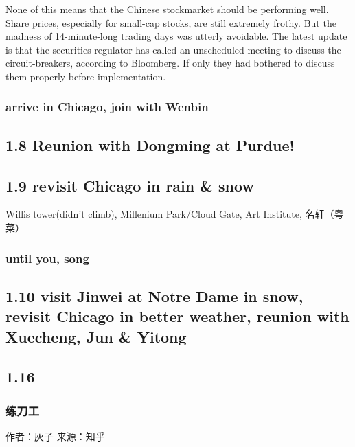 \documentclass[11pt]{article}
\begin{document}
None of this means that the Chinese stockmarket should be performing well. Share
prices, especially for small-cap stocks, are still extremely frothy. But the
madness of 14-minute-long trading days was utterly avoidable. The latest update
is that the securities regulator has called an unscheduled meeting to discuss
the circuit-breakers, according to Bloomberg. If only they had bothered to
discuss them properly before implementation.
\subsubsection*{arrive in Chicago, join with Wenbin}
\label{sec:orgheadline22}
\subsection*{1.8 Reunion with Dongming at Purdue!}
\label{sec:orgheadline24}
\subsection*{1.9 revisit Chicago in rain \& snow}
\label{sec:orgheadline26}
Willis tower(didn't climb), Millenium Park/Cloud Gate, Art Institute, 名轩（粤菜）
\subsubsection*{\textbf{until you}, song}
\label{sec:orgheadline25}
\subsection*{1.10 visit Jinwei at Notre Dame in snow, revisit Chicago in better weather, reunion with Xuecheng, Jun \& Yitong}
\label{sec:orgheadline27}
\subsection*{1.16}
\label{sec:orgheadline30}
\subsubsection*{练刀工}
\label{sec:orgheadline28}
作者：灰子
来源：知乎
\end{document}
